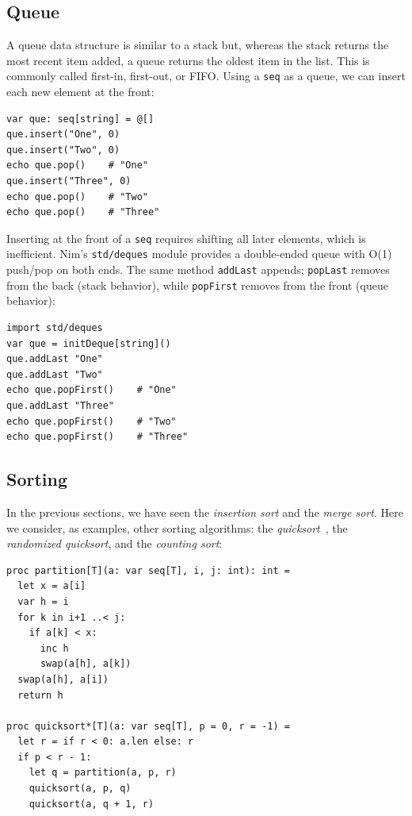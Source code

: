 \documentclass[justified, sixbynine]{tufte-book}
\def\ft{\small\tt}
\theoremstyle{plain}%
\newtheorem * {corollary}{Corollary}
\theoremstyle{definition}
\theoremstyle{remark}
\newtheorem * {remark}{Remark}
\newtheorem * {note}{Note}
\begin{document}
\begin{fullwidth}
\goodbreak\subsection{Queue}

A queue data structure is similar to a stack but, whereas the stack returns the most recent item added, a queue returns the oldest item in the list.  This is commonly called first-in, first-out, or FIFO.  Using a {\ft seq} as a queue, we can insert each new element at the front:

\begin{lstlisting}
var que: seq[string] = @[]
que.insert("One", 0)
que.insert("Two", 0)
echo que.pop()    # "One"
que.insert("Three", 0)
echo que.pop()    # "Two"
echo que.pop()    # "Three"
\end{lstlisting}

Inserting at the front of a {\ft seq} requires shifting all later elements, which is inefficient. Nim's {\ft std/deques} module provides a double-ended queue with O(1) push/pop on both ends. The same method {\ft addLast} appends; {\ft popLast} removes from the back (stack behavior), while {\ft popFirst} removes from the front (queue behavior):

\begin{lstlisting}
import std/deques
var que = initDeque[string]()
que.addLast "One"
que.addLast "Two"
echo que.popFirst()    # "One"
que.addLast "Three"
echo que.popFirst()    # "Two"
echo que.popFirst()    # "Three"
\end{lstlisting}

\goodbreak\subsection{Sorting}


In the previous sections, we have seen the {\it insertion sort} and the {\it merge sort}. Here we consider, as examples, other sorting algorithms: the {\it quicksort}~\cite{mergesort}, the {\it randomized quicksort}, and the {\it counting sort}:

\begin{lstlisting}
proc partition[T](a: var seq[T], i, j: int): int =
  let x = a[i]
  var h = i
  for k in i+1 ..< j:
    if a[k] < x:
      inc h
      swap(a[h], a[k])
  swap(a[h], a[i])
  return h

proc quicksort*[T](a: var seq[T], p = 0, r = -1) =
  let r = if r < 0: a.len else: r
  if p < r - 1:
    let q = partition(a, p, r)
    quicksort(a, p, q)
    quicksort(a, q + 1, r)
\end{lstlisting}


\end{fullwidth}
\end{document}
